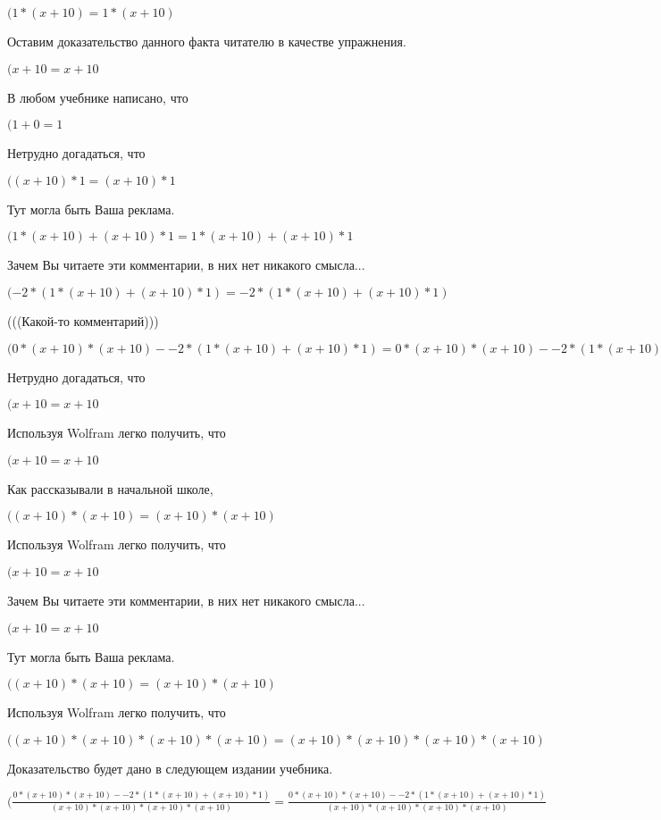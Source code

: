 \documentclass[12pt,a4paper,fleqn]{article}
\theoremstyle{definition}
\begin{document}
$( 1  * ( x  +  10 ) =  1  * ( x  +  10 )$

Оставим доказательство данного факта читателю в качестве упражнения.

$( x  +  10  =  x  +  10 $

В любом учебнике написано, что

$( 1  +  0  =  1 $

Нетрудно догадаться, что

$(( x  +  10 ) *  1  = ( x  +  10 ) *  1 $

Тут могла быть Ваша реклама.

$( 1  * ( x  +  10 ) + ( x  +  10 ) *  1  =  1  * ( x  +  10 ) + ( x  +  10 ) *  1 $

Зачем Вы читаете эти комментарии, в них нет никакого смысла...

$( -2  * ( 1  * ( x  +  10 ) + ( x  +  10 ) *  1 ) =  -2  * ( 1  * ( x  +  10 ) + ( x  +  10 ) *  1 )$

(((Какой-то комментарий)))

$( 0  * ( x  +  10 ) * ( x  +  10 ) -  -2  * ( 1  * ( x  +  10 ) + ( x  +  10 ) *  1 ) =  0  * ( x  +  10 ) * ( x  +  10 ) -  -2  * ( 1  * ( x  +  10 ) + ( x  +  10 ) *  1 )$

Нетрудно догадаться, что

$( x  +  10  =  x  +  10 $

Используя Wolfram легко получить, что

$( x  +  10  =  x  +  10 $

Как рассказывали в начальной школе,

$(( x  +  10 ) * ( x  +  10 ) = ( x  +  10 ) * ( x  +  10 )$

Используя Wolfram легко получить, что

$( x  +  10  =  x  +  10 $

Зачем Вы читаете эти комментарии, в них нет никакого смысла...

$( x  +  10  =  x  +  10 $

Тут могла быть Ваша реклама.

$(( x  +  10 ) * ( x  +  10 ) = ( x  +  10 ) * ( x  +  10 )$

Используя Wolfram легко получить, что

$(( x  +  10 ) * ( x  +  10 ) * ( x  +  10 ) * ( x  +  10 ) = ( x  +  10 ) * ( x  +  10 ) * ( x  +  10 ) * ( x  +  10 )$

Доказательство будет дано в следующем издании учебника.

$(\frac{ 0  * ( x  +  10 ) * ( x  +  10 ) -  -2  * ( 1  * ( x  +  10 ) + ( x  +  10 ) *  1 )}{( x  +  10 ) * ( x  +  10 ) * ( x  +  10 ) * ( x  +  10 )}
 = \frac{ 0  * ( x  +  10 ) * ( x  +  10 ) -  -2  * ( 1  * ( x  +  10 ) + ( x  +  10 ) *  1 )}{( x  +  10 ) * ( x  +  10 ) * ( x  +  10 ) * ( x  +  10 )}
$
\end{document}
